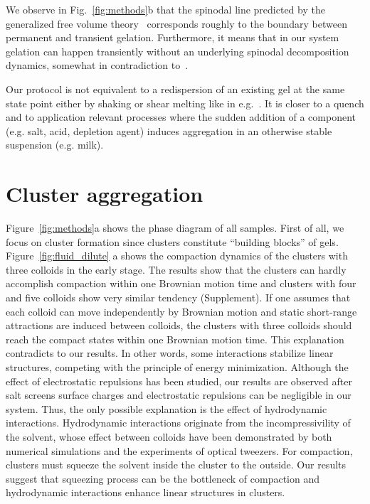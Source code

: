 We observe in Fig.~\ref{fig:methods}b that the spinodal line predicted by the generalized free volume theory~\cite{Fleer2008} corresponds roughly to the boundary between permanent and transient gelation. Furthermore, it means that in our system gelation can happen transiently without an underlying spinodal decomposition dynamics, somewhat in contradiction to~\cite{lu2008gelation}.

Our protocol is not equivalent to a redispersion of an existing gel at the same state point either by shaking or shear melting like in  e.g.~\cite{lu2008gelation,Teece2011,Bartlett2012}. It is closer to a quench and to application relevant processes where the sudden addition of a component (e.g. salt, acid, depletion agent) induces aggregation in an otherwise stable suspension (e.g. milk).



\section{Cluster aggregation} %
Figure~\ref{fig:methods}a shows the phase diagram of all samples.
First of all, we focus on cluster formation since clusters constitute ``building blocks'' of gels.
Figure~\ref{fig:fluid_dilute} a shows the compaction dynamics of the clusters with three colloids in the early stage.
The results show that the clusters can hardly accomplish compaction within one Brownian motion time and clusters with four and five colloids show very similar tendency (Supplement).
If one assumes that each colloid can move independently by Brownian motion and static short-range attractions are induced between colloids, the clusters with three colloids should reach the compact states within one Brownian motion time.
This explanation contradicts to our results.
In other words, some interactions stabilize linear structures, competing with the principle of energy minimization.
Although the effect of electrostatic repulsions has been studied, our results are observed after salt screens surface charges and electrostatic repulsions can be negligible in our system.
Thus, the only possible explanation is the effect of hydrodynamic interactions.
Hydrodynamic interactions originate from the incompressivility of the solvent, whose effect between colloids have been demonstrated by both numerical simulations and the experiments of optical tweezers.
For compaction, clusters must squeeze the solvent inside the cluster to the outside.
Our results suggest that squeezing process can be the bottleneck of compaction and hydrodynamic interactions enhance linear structures in clusters.



